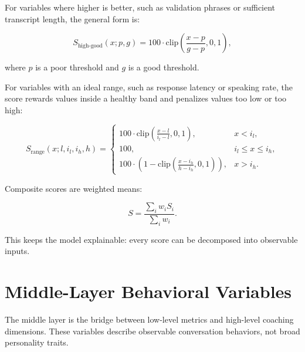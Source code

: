 \documentclass[11pt]{article}
\begin{document}
For variables where higher is better, such as validation phrases or sufficient transcript length, the general form is:

\[
S_{\text{high-good}}(x; p, g)
= 100 \cdot \mathrm{clip}\left(\frac{x-p}{g-p}, 0, 1\right),
\]

where \(p\) is a poor threshold and \(g\) is a good threshold.

For variables with an ideal range, such as response latency or speaking rate, the score rewards values inside a healthy band and penalizes values too low or too high:

\[
S_{\text{range}}(x; l, i_l, i_h, h)
=
\begin{cases}
100 \cdot \mathrm{clip}\left(\frac{x-l}{i_l-l},0,1\right), & x < i_l,\\
100, & i_l \leq x \leq i_h,\\
100 \cdot \left(1-\mathrm{clip}\left(\frac{x-i_h}{h-i_h},0,1\right)\right), & x > i_h.
\end{cases}
\]

Composite scores are weighted means:

\[
S = \frac{\sum_i w_i S_i}{\sum_i w_i}.
\]

This keeps the model explainable: every score can be decomposed into observable inputs.

\section{Middle-Layer Behavioral Variables}

The middle layer is the bridge between low-level metrics and high-level coaching dimensions. These variables describe observable conversation behaviors, not broad personality traits.
\end{document}

